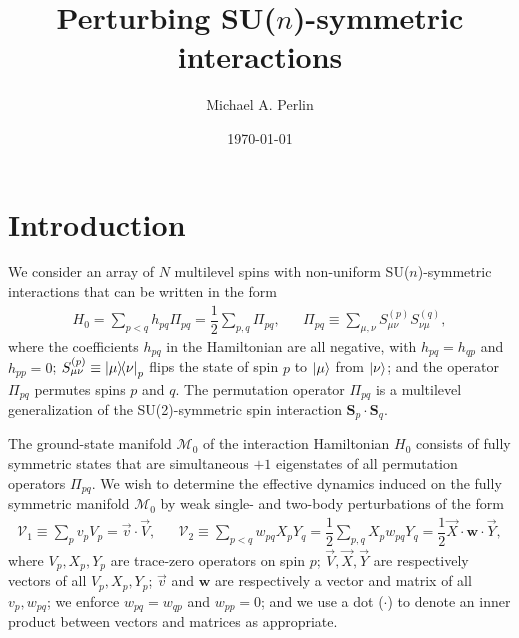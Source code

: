 \documentclass[nofootinbib,notitlepage,11pt]{revtex4-2}
\newcommand{\f}[2]{\dfrac{#1}{#2}} %
\renewcommand{\c}{\cdot} %
\newcommand{\m}{\bm} %
\renewcommand{\v}{\vec} %
\newcommand{\1}{\mathds{1}}
\newcommand{\M}{\mathcal{M}}
\newcommand{\V}{\mathcal{V}}
\begin{document}
\title{Perturbing SU($n$)-symmetric interactions}%
\author{Michael A. Perlin}%
\date{\today}

\maketitle

\tableofcontents

\section{Introduction}

We consider an array of $N$ multilevel spins with non-uniform
SU($n$)-symmetric interactions that can be written in the form
\begin{align}
  H_0 = \sum_{p<q} h_{pq} \Pi_{pq}
  = \f12 \sum_{p,q} \Pi_{pq},
  &&
  \Pi_{pq} \equiv \sum_{\mu,\nu} S_{\mu\nu}^{(p)} S_{\nu\mu}^{(q)},
  \label{eq:ints}
\end{align}
where the coefficients $h_{pq}$ in the Hamiltonian are all negative,
with $h_{pq}=h_{qp}$ and $h_{pp}=0$;
$S_{\mu\nu}^{(p)}\equiv\op{\mu}{\nu}_p$ flips the state of spin $p$ to
$\ket\mu$ from $\ket\nu$; and the operator $\Pi_{pq}$ permutes spins
$p$ and $q$.  The permutation operator $\Pi_{pq}$ is a multilevel
generalization of the SU(2)-symmetric spin interaction
$\m S_p\c\m S_q$.

The ground-state manifold $\M_0$ of the interaction Hamiltonian $H_0$
consists of fully symmetric states that are simultaneous $+1$
eigenstates of all permutation operators $\Pi_{pq}$.  We wish to
determine the effective dynamics induced on the fully symmetric
manifold $\M_0$ by weak single- and two-body perturbations of the form
\begin{align}
  \V_1 \equiv \sum_p v_p V_p = \v v\c\v V,
  &&
  \V_2 \equiv \sum_{p<q} w_{pq} X_p Y_q
  = \f12 \sum_{p,q} X_p w_{pq} Y_q
  = \f12 \v X \c\m w \c\v Y,
  \label{eq:perturbations}
\end{align}
where $V_p,X_p,Y_p$ are trace-zero operators on spin $p$;
$\v V,\v X,\v Y$ are respectively vectors of all $V_p,X_p,Y_p$; $\v v$
and $\m w$ are respectively a vector and matrix of all $v_p,w_{pq}$;
we enforce $w_{pq}=w_{qp}$ and $w_{pp}=0$; and we use a dot ($\c$) to
denote an inner product between vectors and matrices as appropriate.
\end{document}
